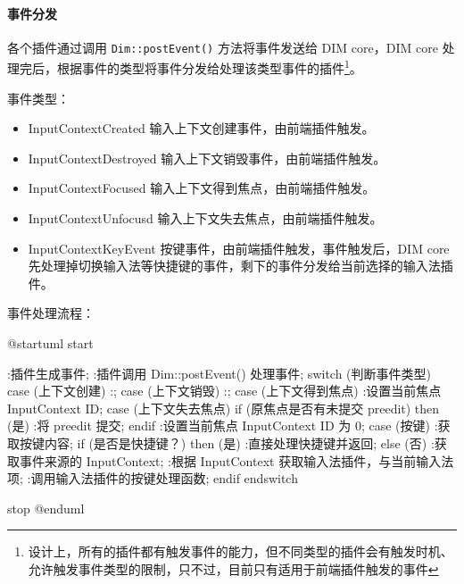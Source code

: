 \documentclass{utart}
\begin{document}
            \paragraph{事件分发}
                \par 各个插件通过调用 \texttt{Dim::postEvent()} 方法将事件发送给 DIM core，DIM core 处理完后，根据事件的类型将事件分发给处理该类型事件的插件\footnote{设计上，所有的插件都有触发事件的能力，但不同类型的插件会有触发时机、允许触发事件类型的限制，只不过，目前只有适用于前端插件触发的事件}。

                \par 事件类型：
                \begin{itemize}
                    \item{InputContextCreated} 输入上下文创建事件，由前端插件触发。
                    \item{InputContextDestroyed} 输入上下文销毁事件，由前端插件触发。
                    \item{InputContextFocused} 输入上下文得到焦点，由前端插件触发。
                    \item{InputContextUnfocusd} 输入上下文失去焦点，由前端插件触发。
                    \item{InputContextKeyEvent} 按键事件，由前端插件触发，事件触发后，DIM core 先处理掉切换输入法等快捷键的事件，剩下的事件分发给当前选择的输入法插件。
                \end{itemize}

                \par 事件处理流程：

                \begin{plantuml}
                @startuml
                start

                :插件生成事件;
                :插件调用 Dim::postEvent() 处理事件;
                switch (判断事件类型)
                case (上下文创建)
                    :;
                case (上下文销毁)
                    :;
                case (上下文得到焦点)
                    :设置当前焦点 InputContext ID;
                case (上下文失去焦点)
                    if (原焦点是否有未提交 preedit) then (是)
                        :将 preedit 提交;
                    endif
                    :设置当前焦点 InputContext ID 为 0;
                case (按键)
                    :获取按键内容;
                    if (是否是快捷键？) then (是)
                        :直接处理快捷键并返回;
                    else (否)
                        :获取事件来源的 InputContext;
                        :根据 InputContext 获取输入法插件，与当前输入法项;
                        :调用输入法插件的按键处理函数;
                    endif
                endswitch

                stop
                @enduml
                \end{plantuml}
\end{document}
